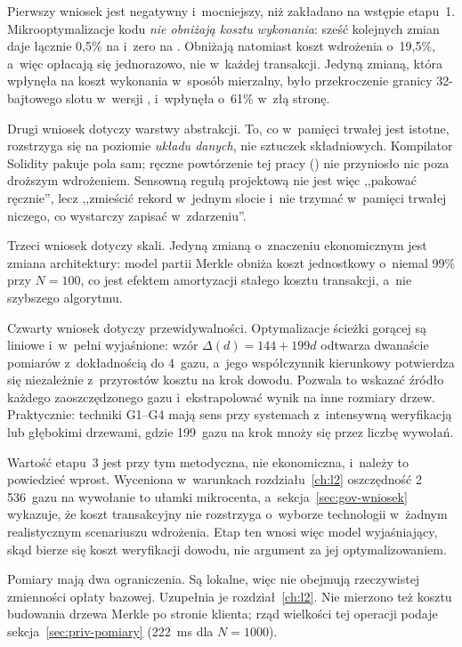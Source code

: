 Pierwszy wniosek jest negatywny i~mocniejszy, niż zakładano na wstępie etapu~1.
Mikrooptymalizacje kodu \emph{nie obniżają kosztu wykonania}: sześć kolejnych
zmian daje łącznie 0{,}5\% na  i~zero na . Obniżają
natomiast koszt wdrożenia o~19{,}5\%, a~więc opłacają się jednorazowo, nie
w~każdej transakcji. Jedyną zmianą, która wpłynęła na koszt wykonania w~sposób
mierzalny, było przekroczenie granicy 32-bajtowego slotu w~wersji
, i~wpłynęła o~61\% w~złą stronę.

Drugi wniosek dotyczy warstwy abstrakcji. To, co w~pamięci trwałej jest istotne,
rozstrzyga się na poziomie \emph{układu danych}, nie sztuczek składniowych.
Kompilator Solidity pakuje pola sam; ręczne powtórzenie tej pracy
() nie przyniosło nic poza droższym wdrożeniem. Sensowną
regułą projektową nie jest więc ,,pakować ręcznie'', lecz ,,zmieścić rekord
w~jednym slocie i~nie trzymać w~pamięci trwałej niczego, co wystarczy zapisać
w~zdarzeniu''.

Trzeci wniosek dotyczy skali. Jedyną zmianą o~znaczeniu ekonomicznym jest zmiana
architektury: model partii Merkle obniża koszt jednostkowy o~niemal 99\% przy
$N=100$, co jest efektem amortyzacji stałego kosztu transakcji, a~nie szybszego
algorytmu.

Czwarty wniosek dotyczy przewidywalności. Optymalizacje ścieżki gorącej są
liniowe i~w~pełni wyjaśnione: wzór $\Delta(d) = 144 + 199d$ odtwarza dwanaście
pomiarów z~dokładnością do 4~gazu, a~jego współczynnik kierunkowy potwierdza się
niezależnie z~przyrostów kosztu na krok dowodu. Pozwala to wskazać źródło każdego
zaoszczędzonego gazu i~ekstrapolować wynik na inne rozmiary drzew. Praktycznie:
techniki G1--G4 mają sens przy systemach z~intensywną weryfikacją lub głębokimi
drzewami, gdzie 199~gazu na krok mnoży się przez liczbę wywołań.

Wartość etapu~3 jest przy tym metodyczna, nie ekonomiczna, i~należy to
powiedzieć wprost. Wyceniona w~warunkach rozdziału~\ref{ch:l2} oszczędność
2\,536~gazu na wywołanie to ułamki mikrocenta, a~sekcja~\ref{sec:gov-wniosek}
wykazuje, że koszt transakcyjny nie rozstrzyga o~wyborze technologii w~żadnym
realistycznym scenariuszu wdrożenia. Etap ten wnosi więc model wyjaśniający,
skąd bierze się koszt weryfikacji dowodu, nie argument za jej optymalizowaniem.

Pomiary mają dwa ograniczenia. Są lokalne, więc nie obejmują rzeczywistej
zmienności opłaty bazowej. Uzupełnia je rozdział~\ref{ch:l2}. Nie mierzono
też kosztu budowania drzewa Merkle po stronie klienta; rząd wielkości tej
operacji podaje sekcja~\ref{sec:priv-pomiary} (222~ms dla $N=1000$).
